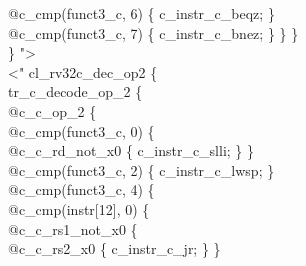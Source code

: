 {\indent \hspace{\parindent} \hspace{\parindent} @c\_cmp(funct3\_c, 6) \{ c\_instr\_c\_beqz; \}\\%
\indent \hspace{\parindent} \hspace{\parindent} @c\_cmp(funct3\_c, 7) \{ c\_instr\_c\_bnez; \} \} \}\\%
\} "\textgreater\\%
\newpage
\noindent \textless" cl\_rv32c\_dec\_op2 \{\\%
\indent tr\_c\_decode\_op\_2 \{\\%
\indent \hspace{\parindent} @c\_c\_op\_2 \{\\%
\indent \hspace{\parindent} \hspace{\parindent} @c\_cmp(funct3\_c, 0) \{\\%
\indent \hspace{\parindent} \hspace{\parindent} \hspace{\parindent}@c\_c\_rd\_not\_x0 \{ c\_instr\_c\_slli; \} \}\\%
\indent \hspace{\parindent} \hspace{\parindent} @c\_cmp(funct3\_c, 2) \{ c\_instr\_c\_lwsp; \}\\%
\indent \hspace{\parindent} \hspace{\parindent} @c\_cmp(funct3\_c, 4) \{\\%
\indent \hspace{\parindent} \hspace{\parindent} \hspace{\parindent} @c\_cmp(instr[12], 0) \{\\%
\indent \hspace{\parindent} \hspace{\parindent} \hspace{\parindent} \hspace{\parindent} @c\_c\_rs1\_not\_x0 \{\\%
\indent \hspace{\parindent} \hspace{\parindent} \hspace{\parindent} \hspace{\parindent} \hspace{\parindent} @c\_c\_rs2\_x0 \{ c\_instr\_c\_jr; \} \}\\%
}
